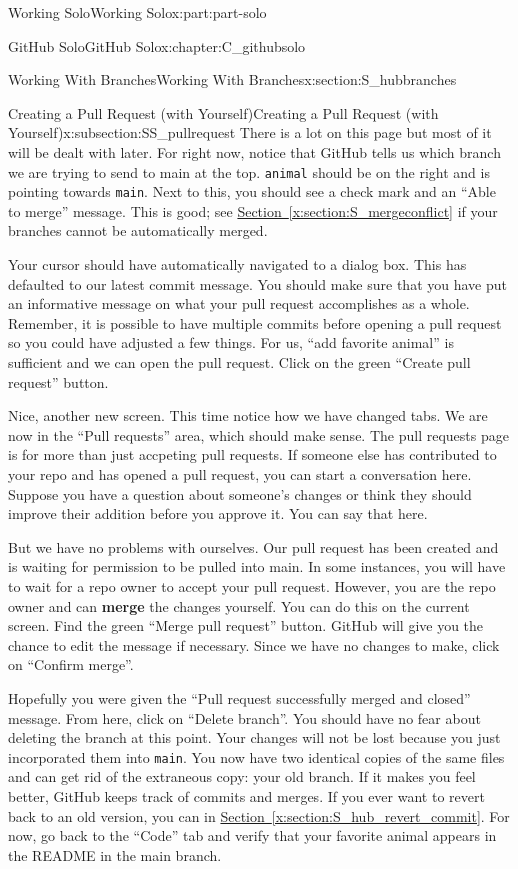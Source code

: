 \documentclass[oneside,10pt,]{book}
\newcommand{\xreffont}{\relax}
\newcommand{\mono}[1]{\texttt{#1}}
\newcommand{\terminology}[1]{\textbf{#1}}
\begin{document}
\begin{partptx}{Working Solo}{}{Working Solo}{}{}{x:part:part-solo}
\begin{chapterptx}{GitHub Solo}{}{GitHub Solo}{}{}{x:chapter:C_githubsolo}
\begin{sectionptx}{Working With Branches}{}{Working With Branches}{}{}{x:section:S_hubbranches}
\begin{subsectionptx}{Creating a Pull Request (with Yourself)}{}{Creating a Pull Request (with Yourself)}{}{}{x:subsection:SS_pullrequest}
There is a lot on this page but most of it will be dealt with later. For right now, notice that GitHub tells us which branch we are trying to send to main at the top. \mono{animal} should be on the right and is pointing towards \mono{main}. Next to this, you should see a check mark and an ``Able to merge'' message. This is good; see \hyperref[x:section:S_mergeconflict]{Section~{\xreffont\ref{x:section:S_mergeconflict}}} if your branches cannot be automatically merged.%
\par
Your cursor should have automatically navigated to a dialog box. This has defaulted to our latest commit message. You should make sure that you have put an informative message on what your pull request accomplishes as a whole. Remember, it is possible to have multiple commits before opening a pull request so you could have adjusted a few things. For us, ``add favorite animal'' is sufficient and we can open the pull request. Click on the green ``Create pull request'' button.%
\par
Nice, another new screen. This time notice how we have changed tabs. We are now in the ``Pull requests'' area, which should make sense. The pull requests page is for more than just accpeting pull requests. If someone else has contributed to your repo and has opened a pull request, you can start a conversation here. Suppose you have a question about someone's changes or think they should improve their addition before you approve it. You can say that here.%
\par
But we have no problems with ourselves. Our pull request has been created and is waiting for permission to be pulled into main. In some instances, you will have to wait for a repo owner to accept your pull request. However, you are the repo owner and can \terminology{merge} the changes yourself. You can do this on the current screen. Find the green ``Merge pull request'' button. GitHub will give you the chance to edit the message if necessary. Since we have no changes to make, click on ``Confirm merge''.%
\par
Hopefully you were given the ``Pull request successfully merged and closed'' message. From here, click on ``Delete branch''. You should have no fear about deleting the branch at this point. Your changes will not be lost because you just incorporated them into \mono{main}. You now have two identical copies of the same files and can get rid of the extraneous copy: your old branch. If it makes you feel better, GitHub keeps track of commits and merges. If you ever want to revert back to an old version, you can in \hyperref[x:section:S_hub_revert_commit]{Section~{\xreffont\ref{x:section:S_hub_revert_commit}}}. For now, go back to the ``Code'' tab and verify that your favorite animal appears in the README in the main branch.%

\end{subsectionptx}
\end{sectionptx}
\end{chapterptx}
\end{partptx}
\end{document}
